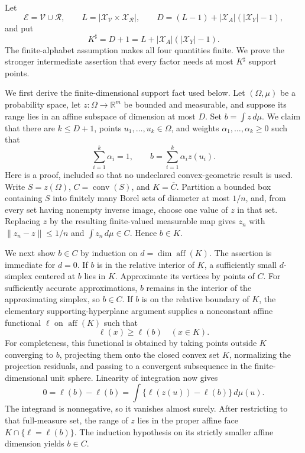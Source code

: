 Let
\[
 \mathcal E=\mathcal V\cup\mathcal R,
 \qquad
 L=\left|\mathcal X_{\mathcal V}\times\mathcal X_{\mathcal R}\right|,
 \qquad
 D=(L-1)+|\mathcal X_A|(|\mathcal X_Y|-1),
\]
and put
\[
 K^{\sharp}=D+1=L+|\mathcal X_A|(|\mathcal X_Y|-1).
\]
The finite-alphabet assumption makes all four quantities finite.  We prove the stronger intermediate assertion that every factor needs at most \(K^{\sharp}\) support points.

We first derive the finite-dimensional support fact used below.  Let \((\Omega,\mu)\) be a probability space, let \(z:\Omega\to\mathbb R^m\) be bounded and measurable, and suppose its range lies in an affine subspace of dimension at most \(D\).  Set \(b=\int z\,d\mu\).  We claim that there are \(k\leq D+1\), points \(u_1,\ldots,u_k\in\Omega\), and weights \(\alpha_1,\ldots,\alpha_k\geq0\) such that
\[
 \sum_{i=1}^k\alpha_i=1,
 \qquad
 b=\sum_{i=1}^k\alpha_i z(u_i).
 \tag{1}
\]
Here is a proof, included so that no undeclared convex-geometric result is used.  Write \(S=z(\Omega)\), \(C=\operatorname{conv}(S)\), and \(K=\overline C\).  Partition a bounded box containing \(S\) into finitely many Borel sets of diameter at most \(1/n\), and, from every set having nonempty inverse image, choose one value of \(z\) in that set.  Replacing \(z\) by the resulting finite-valued measurable map gives \(z_n\) with \(\|z_n-z\|\leq1/n\) and \(\int z_n\,d\mu\in C\).  Hence \(b\in K\).

We next show \(b\in C\) by induction on \(d=\dim\operatorname{aff}(K)\).  The assertion is immediate for \(d=0\).  If \(b\) is in the relative interior of \(K\), a sufficiently small \(d\)-simplex centered at \(b\) lies in \(K\).  Approximate its vertices by points of \(C\).  For sufficiently accurate approximations, \(b\) remains in the interior of the approximating simplex, so \(b\in C\).  If \(b\) is on the relative boundary of \(K\), the elementary supporting-hyperplane argument supplies a nonconstant affine functional \(\ell\) on \(\operatorname{aff}(K)\) such that
\[
 \ell(x)\geq\ell(b)\quad(x\in K).
\]
For completeness, this functional is obtained by taking points outside \(K\) converging to \(b\), projecting them onto the closed convex set \(K\), normalizing the projection residuals, and passing to a convergent subsequence in the finite-dimensional unit sphere.  Linearity of integration now gives
\[
 0=\ell(b)-\ell(b)
 =\int\{\ell(z(u))-\ell(b)\}\,d\mu(u).
\]
The integrand is nonnegative, so it vanishes almost surely.  After restricting to that full-measure set, the range of \(z\) lies in the proper affine face \(K\cap\{\ell=\ell(b)\}\).  The induction hypothesis on its strictly smaller affine dimension yields \(b\in C\).

